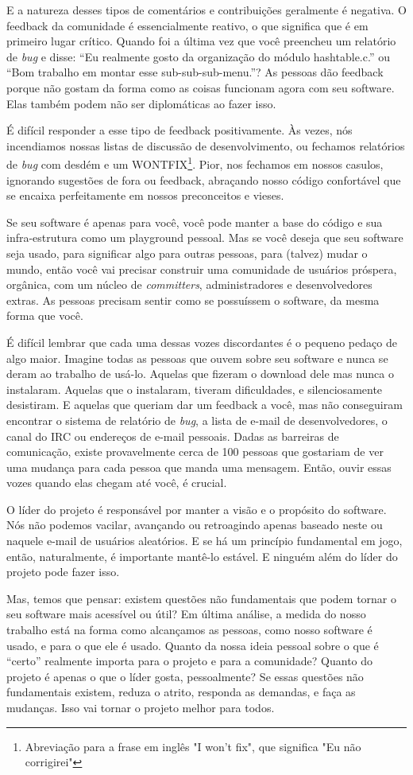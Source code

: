 E a natureza desses tipos de comentários e contribuições geralmente é negativa.
O feedback da comunidade é essencialmente reativo, o que significa que é em primeiro lugar crítico.
Quando foi a última vez que você preencheu um relatório de \textit{bug} e disse: ``Eu realmente gosto da
organização do módulo hashtable.c.'' ou ``Bom trabalho em montar esse
sub-sub-sub-menu.''? As pessoas dão feedback porque não gostam da forma como as coisas 
funcionam agora com seu software. Elas também podem não ser diplomáticas ao fazer isso.

É difícil responder a esse tipo de feedback positivamente. Às vezes, nós incendiamos
nossas listas de discussão de desenvolvimento, ou fechamos relatórios de \textit{bug} 
com desdém e um WONTFIX\footnote{Abreviação para a frase em inglês "I won't fix", que
significa "Eu não corrigirei"}. Pior, nos fechamos em nossos casulos, ignorando sugestões
de fora ou feedback, abraçando nosso código confortável que se encaixa perfeitamente
em nossos preconceitos e vieses.

Se seu software é apenas para você, você pode manter a base do código e sua
infra-estrutura como um playground pessoal. Mas se você deseja que seu software 
seja usado, para significar algo para outras pessoas, para (talvez) mudar o mundo,
então você vai precisar construir uma comunidade de usuários próspera, orgânica,
com um núcleo de \textit{committers}, administradores e desenvolvedores extras. 
As pessoas precisam sentir como se possuíssem o software, da mesma forma que você.

É difícil lembrar que cada uma dessas vozes discordantes é o pequeno pedaço
de algo maior. Imagine todas as pessoas que ouvem sobre seu software e
nunca se deram ao trabalho de usá-lo. Aquelas que fizeram o download dele mas
nunca o instalaram. Aquelas que o instalaram, tiveram dificuldades, e silenciosamente
desistiram. E aquelas que queriam dar um feedback a você, mas não conseguiram
encontrar o sistema de relatório de \textit{bug}, a lista de e-mail de desenvolvedores,
o canal do IRC ou endereços de e-mail pessoais. Dadas as barreiras de comunicação,
existe provavelmente cerca de 100 pessoas que gostariam de ver uma mudança para 
cada pessoa que manda uma mensagem. Então, ouvir essas vozes quando elas
chegam até você, é crucial.

O líder do projeto é responsável por manter a visão e o propósito do software.
Nós não podemos vacilar, avançando ou retroagindo apenas baseado neste ou naquele
e-mail de usuários aleatórios. E se há um princípio fundamental em jogo, então,
naturalmente, é importante mantê-lo estável. E ninguém além do líder do projeto
pode fazer isso.

Mas, temos que pensar: existem questões não fundamentais que podem tornar o seu
software mais acessível ou útil? Em última análise, a medida do nosso trabalho
está na forma como alcançamos as pessoas, como nosso software é usado, e para
o que ele é usado. Quanto da nossa ideia pessoal sobre o que é ``certo'' realmente
importa para o projeto e para a comunidade? Quanto do projeto é apenas o que o líder
gosta, pessoalmente? Se essas questões não fundamentais existem, reduza o atrito,
responda as demandas, e faça as mudanças. Isso vai tornar o projeto melhor
para todos.
